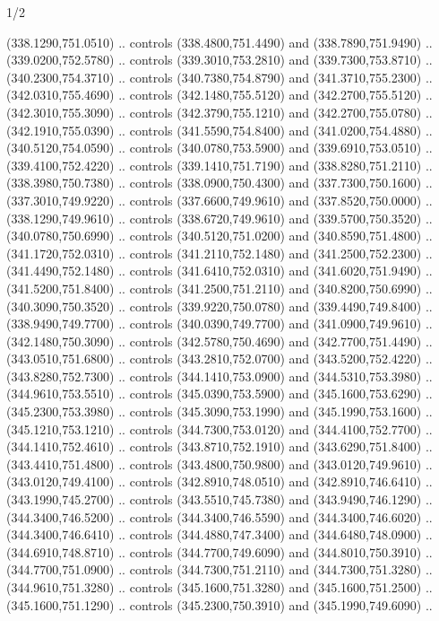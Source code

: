 \begin{flagdescription}{1/2}
\begin{scope}[xshift=0.5\flaglength]
\begin{scope}[scale=0.00745\flagwidth,xshift=-12.1mm,yshift=41.7mm]
\begin{scope}[y=0.80pt, x=0.80pt, yscale=-1, xscale=1, inner sep=0pt, outer sep=0pt]
\begin{scope}[cm={{1.33333,0.0,0.0,-1.33333,(0.0,114.66667)}}]
\begin{scope}[scale=0.100]
  (338.1290,751.0510) .. controls (338.4800,751.4490) and (338.7890,751.9490) ..
  (339.0200,752.5780) .. controls (339.3010,753.2810) and (339.7300,753.8710) ..
  (340.2300,754.3710) .. controls (340.7380,754.8790) and (341.3710,755.2300) ..
  (342.0310,755.4690) .. controls (342.1480,755.5120) and (342.2700,755.5120) ..
  (342.3010,755.3090) .. controls (342.3790,755.1210) and (342.2700,755.0780) ..
  (342.1910,755.0390) .. controls (341.5590,754.8400) and (341.0200,754.4880) ..
  (340.5120,754.0590) .. controls (340.0780,753.5900) and (339.6910,753.0510) ..
  (339.4100,752.4220) .. controls (339.1410,751.7190) and (338.8280,751.2110) ..
  (338.3980,750.7380) .. controls (338.0900,750.4300) and (337.7300,750.1600) ..
  (337.3010,749.9220) .. controls (337.6600,749.9610) and (337.8520,750.0000) ..
  (338.1290,749.9610) .. controls (338.6720,749.9610) and (339.5700,750.3520) ..
  (340.0780,750.6990) .. controls (340.5120,751.0200) and (340.8590,751.4800) ..
  (341.1720,752.0310) .. controls (341.2110,752.1480) and (341.2500,752.2300) ..
  (341.4490,752.1480) .. controls (341.6410,752.0310) and (341.6020,751.9490) ..
  (341.5200,751.8400) .. controls (341.2500,751.2110) and (340.8200,750.6990) ..
  (340.3090,750.3520) .. controls (339.9220,750.0780) and (339.4490,749.8400) ..
  (338.9490,749.7700) .. controls (340.0390,749.7700) and (341.0900,749.9610) ..
  (342.1480,750.3090) .. controls (342.5780,750.4690) and (342.7700,751.4490) ..
  (343.0510,751.6800) .. controls (343.2810,752.0700) and (343.5200,752.4220) ..
  (343.8280,752.7300) .. controls (344.1410,753.0900) and (344.5310,753.3980) ..
  (344.9610,753.5510) .. controls (345.0390,753.5900) and (345.1600,753.6290) ..
  (345.2300,753.3980) .. controls (345.3090,753.1990) and (345.1990,753.1600) ..
  (345.1210,753.1210) .. controls (344.7300,753.0120) and (344.4100,752.7700) ..
  (344.1410,752.4610) .. controls (343.8710,752.1910) and (343.6290,751.8400) ..
  (343.4410,751.4800) .. controls (343.4800,750.9800) and (343.0120,749.9610) ..
  (343.0120,749.4100) .. controls (342.8910,748.0510) and (342.8910,746.6410) ..
  (343.1990,745.2700) .. controls (343.5510,745.7380) and (343.9490,746.1290) ..
  (344.3400,746.5200) .. controls (344.3400,746.5590) and (344.3400,746.6020) ..
  (344.3400,746.6410) .. controls (344.4880,747.3400) and (344.6480,748.0900) ..
  (344.6910,748.8710) .. controls (344.7700,749.6090) and (344.8010,750.3910) ..
  (344.7700,751.0900) .. controls (344.7300,751.2110) and (344.7300,751.3280) ..
  (344.9610,751.3280) .. controls (345.1600,751.3280) and (345.1600,751.2500) ..
  (345.1600,751.1290) .. controls (345.2300,750.3910) and (345.1990,749.6090) ..

\end{scope}
\end{scope}
\end{scope}
\end{scope}
\end{scope}
\end{flagdescription}
